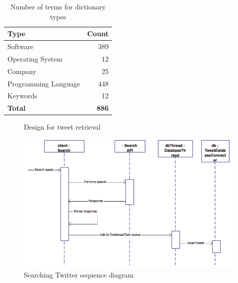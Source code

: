 \begin{table}[h]
\begin{center}
\begin{tabular}{|l|r|}\hline\hline
\textbf{Type}&\textbf{Count}\\\hline
Software&389\\
Operating System&12\\
Company&25\\
Programming Language&448\\
Keywords&12\\\hline
\textbf{Total}&\textbf{886}\\\hline\hline
\end{tabular}
\end{center}
\caption{Number of terms for dictionary types}
\label{tbl:dict_types}
\end{table}

\begin{figure}[h]
  \centering
  
  \caption{Design for tweet retrieval
    \label{fig:phase1}}
\end{figure}

\begin{figure}[h]
\begin{center}
\includegraphics[width=13cm]{ucsearch}
\end{center}
\caption{Searching Twitter sequence diagram}
\label{fig:ucsearch}
\end{figure}


